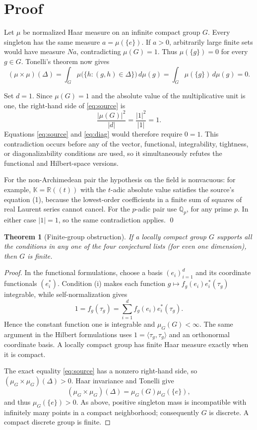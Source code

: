 \documentclass[10pt]{article}
\newtheorem{theorem}{Theorem}
\newcommand{\K}{\mathbb K}
\newcommand{\Qp}{\mathbb Q_p}
\begin{document}
\section*{Proof}

Let \(\mu\) be normalized Haar measure on an infinite compact group \(G\).
Every singleton has the same measure \(a=\mu(\{e\})\).  If \(a>0\), arbitrarily
large finite sets would have measure \(Na\), contradicting \(\mu(G)=1\).
Thus \(\mu(\{g\})=0\) for every \(g\in G\).  Tonelli's theorem now gives
\begin{equation}\label{eq:diag}
 (\mu\times\mu)(\Delta)
 =\int_G \mu\bigl(\{h:(g,h)\in\Delta\}\bigr)\,d\mu(g)
 =\int_G\mu(\{g\})\,d\mu(g)=0.
\end{equation}

Set \(d=1\).  Since \(\mu(G)=1\) and the absolute value of the multiplicative
unit is one, the right-hand side of \eqref{eq:source} is
\[
 \frac{|\mu(G)|^2}{|d|}=\frac{|1|^2}{|1|}=1.
\]
Equations \eqref{eq:source} and \eqref{eq:diag} would therefore require
\(0=1\).  This contradiction occurs before any of the vector, functional,
integrability, tightness, or diagonalizability conditions are used, so it
simultaneously refutes the functional and Hilbert-space versions.

For the non-Archimedean pair the hypothesis on the field is nonvacuous: for
example, \(\K=\mathbb R((t))\) with the \(t\)-adic absolute value satisfies the
source's equation (1), because the lowest-order coefficients in a finite sum
of squares of real Laurent series cannot cancel.  For the \(p\)-adic pair use
\(\Qp\), for any prime \(p\).  In either case \(|1|=1\), so the same
contradiction applies. \qed

\begin{theorem}[Finite-group obstruction]\label{thm:finite}
If a locally compact group \(G\) supports all the conditions in any one of the
four conjectural lists (for even one dimension), then \(G\) is finite.
\end{theorem}

\begin{proof}
In the functional formulations, choose a basis \((e_i)_{i=1}^d\) and its
coordinate functionals \((e_i^*)\).  Condition (i) makes each function
\(g\mapsto f_g(e_i)e_i^*(\tau_g)\) integrable, while self-normalization gives
\[
 1=f_g(\tau_g)=\sum_{i=1}^d f_g(e_i)e_i^*(\tau_g).
\]
Hence the constant function one is integrable and \(\mu_G(G)<\infty\).  The
same argument in the Hilbert formulations uses
\(1=\langle\tau_g,\tau_g\rangle\) and an orthonormal coordinate basis.  A
locally compact group has finite Haar measure exactly when it is compact.

The exact equality \eqref{eq:source} has a nonzero right-hand side, so
\((\mu_G\times\mu_G)(\Delta)>0\).  Haar invariance and Tonelli give
\[
 (\mu_G\times\mu_G)(\Delta)=\mu_G(G)\mu_G(\{e\}),
\]
and thus \(\mu_G(\{e\})>0\).  As above, positive singleton mass is incompatible
with infinitely many points in a compact neighborhood; consequently \(G\) is
discrete.  A compact discrete group is finite.
\end{proof}
\end{document}

